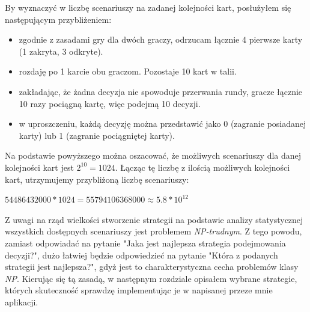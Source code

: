 By wyznaczyć w liczbę scenariuszy na zadanej kolejności kart, posłużyłem się następującym przybliżeniem:
\begin{itemize}
	\item zgodnie z zasadami gry dla dwóch graczy, odrzucam łącznie 4 pierwsze karty (1 zakryta, 3 odkryte).
	\item rozdaję po 1 karcie obu graczom. Pozostaje 10 kart w talii.
	\item zakładając, że żadna decyzja nie spowoduje przerwania rundy, gracze łącznie 10 razy pociągną kartę, więc podejmą 10 decyzji.
	\item w uproszczeniu, każdą decyzję można przedstawić jako 0 (zagranie posiadanej karty) lub 1 (zagranie pociągniętej karty).
\end{itemize}
Na podstawie powyższego można oszacować, że możliwych scenariuszy dla danej kolejności kart jest $2^{10}=1024$. Łącząc tę liczbę z ilością możliwych kolejności kart, utrzymujemy przybliżoną liczbę scenariuszy:

\begin{center}
	$54486432000 * 1024 = 55794106368000 \approx  5.8*10^{12}$
\end{center}

Z uwagi na rząd wielkości stworzenie strategii na podstawie analizy statystycznej wszystkich dostępnych scenariuszy jest problemem \textit{NP-trudnym}. Z tego powodu, zamiast odpowiadać na pytanie "Jaka jest najlepsza strategia podejmowania decyzji?", dużo łatwiej będzie odpowiedzieć na pytanie "Która z podanych strategii jest najlepsza?", gdyż jest to charakterystyczna cecha problemów klasy \textit{NP}. Kierując się tą zasadą, w następnym rozdziale opisałem wybrane strategie, których skuteczność sprawdzę implementując je w napisanej przeze mnie aplikacji.